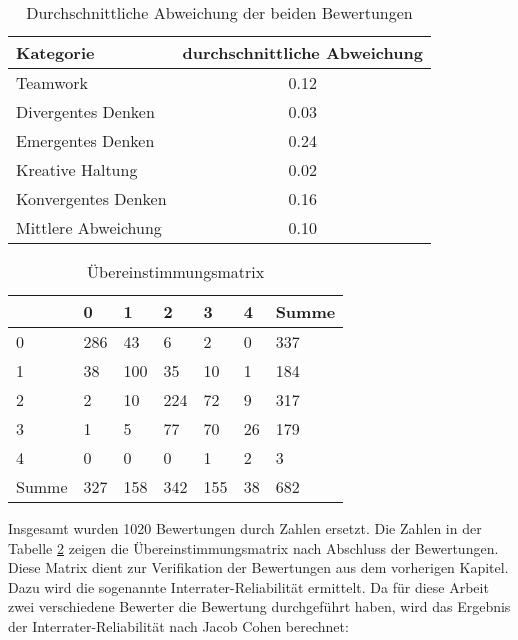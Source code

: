 \begin{table}[H]
	\centering
	\begin{tabular}{|
			>{\columncolor[HTML]{C0C0C0}}l |c|}
		\hline
		Kategorie & \multicolumn{1}{l|}{\cellcolor[HTML]{C0C0C0}durchschnittliche Abweichung} \\ \hline
		Teamwork            & 0.12 \\ \hline
		Divergentes Denken  & 0.03 \\ \hline
		Emergentes Denken   & 0.24 \\ \hline
		Kreative Haltung    & 0.02 \\ \hline
		Konvergentes Denken & 0.16 \\ \hline
		Mittlere Abweichung & 0.10 \\ \hline
	\end{tabular}
	\caption{Durchschnittliche Abweichung der beiden Bewertungen}
	\label{tab:differences}
\end{table}

\begin{table}[H]
	\centering
	\begin{tabular}{l|l|l|l|l|l|l|}
		\cline{2-7}
		&
		\cellcolor[HTML]{C0C0C0}0 &
		\cellcolor[HTML]{C0C0C0}1 &
		\cellcolor[HTML]{C0C0C0}2 &
		\cellcolor[HTML]{C0C0C0}3 &
		\cellcolor[HTML]{C0C0C0}4 &
		\cellcolor[HTML]{C0C0C0}Summe \\ \hline
		\multicolumn{1}{|l|}{\cellcolor[HTML]{C0C0C0}0}     & 286 & 43  & 6   & 2   & 0  & 337 \\ \hline
		\multicolumn{1}{|l|}{\cellcolor[HTML]{C0C0C0}1}     & 38  & 100 & 35  & 10  & 1  & 184 \\ \hline
		\multicolumn{1}{|l|}{\cellcolor[HTML]{C0C0C0}2}     & 2   & 10  & 224 & 72  & 9  & 317 \\ \hline
		\multicolumn{1}{|l|}{\cellcolor[HTML]{C0C0C0}3}     & 1   & 5   & 77  & 70  & 26 & 179 \\ \hline
		\multicolumn{1}{|l|}{\cellcolor[HTML]{C0C0C0}4}     & 0   & 0   & 0   & 1   & 2  & 3   \\ \hline
		\multicolumn{1}{|l|}{\cellcolor[HTML]{C0C0C0}Summe} & 327 & 158 & 342 & 155 & 38 & 682 \\ \hline
	\end{tabular}
	\caption{Übereinstimmungsmatrix}
	\label{tab:agreement}
\end{table}

 
 Insgesamt wurden 1020 Bewertungen durch Zahlen ersetzt. Die Zahlen in der Tabelle \ref{tab:agreement} zeigen die Übereinstimmungsmatrix nach Abschluss der Bewertungen. Diese Matrix dient zur Verifikation der Bewertungen aus dem vorherigen Kapitel. Dazu wird die sogenannte Interrater-Reliabilität ermittelt. Da für diese Arbeit zwei verschiedene Bewerter die Bewertung durchgeführt haben, wird das Ergebnis der Interrater-Reliabilität nach Jacob Cohen berechnet:\cite{cohen_1960}\\
 
